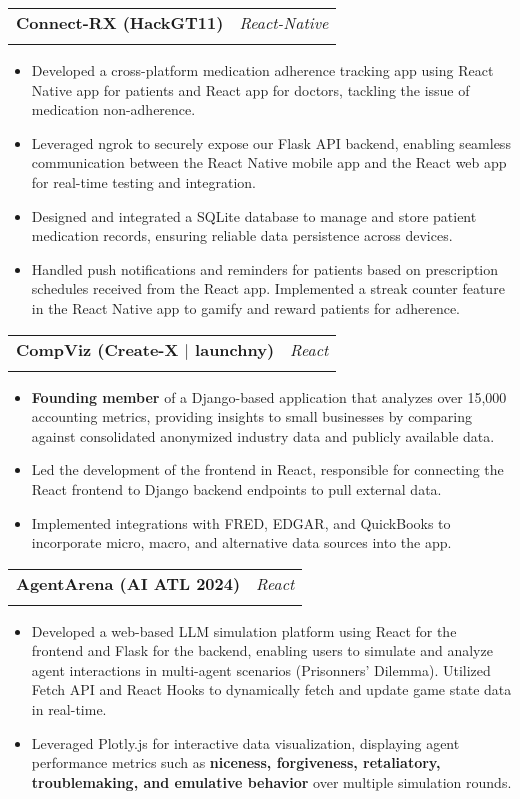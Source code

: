 \documentclass[letterpaper,11pt]{article}
\makeatletter
\newcommand{\resumeItem}[1]{
  \item\small{
    {#1 \vspace{-2pt}}
  }
}
\newcommand{\resumeSubheading}[4]{
  \vspace{-2pt}\item
    \begin{tabular*}{0.97\textwidth}[t]{l@{\extracolsep{\fill}}r}
      \textbf{#1} & #2 \\
      \textit{\small#3} & \textit{\small #4} \\
    \end{tabular*}\vspace{-7pt}
}
\newcommand{\resumeItemListStart}{\begin{itemize}}
\newcommand{\resumeItemListEnd}{\end{itemize}\vspace{-8pt}}
\makeatother
\begin{document}
    \resumeSubheading
    {Connect-RX (HackGT11)}{\textit{React-Native}}
    {}{}
    \resumeItemListStart
    \vspace{-5mm}
      \resumeItem{Developed a cross-platform medication adherence tracking app using React Native app for patients and React app for doctors, tackling the issue of medication non-adherence.}
      \resumeItem{Leveraged ngrok to securely expose our Flask API backend, enabling seamless communication between the React Native mobile app and the React web app for real-time testing and integration.}
      \resumeItem{Designed and integrated a SQLite database to manage and store patient medication records, ensuring reliable data persistence across devices.}
      \resumeItem{Handled push notifications and reminders for patients based on prescription schedules received from the React app. Implemented a streak counter feature in the React Native app to gamify and reward patients for adherence.}
    \resumeItemListEnd

    \resumeSubheading
    {CompViz (Create-X $|$ launchny)}{\textit{React}}
    {}{}
    \resumeItemListStart
    \vspace{-5mm}
      \resumeItem{\textbf{Founding member} of a Django-based application that analyzes over 15,000 accounting metrics, providing insights to small businesses by comparing against consolidated anonymized industry data and publicly available data.}
      \resumeItem{Led the development of the frontend in React, responsible for connecting the React frontend to Django backend endpoints to pull external data.}
      \resumeItem{Implemented integrations with FRED, EDGAR, and QuickBooks to incorporate micro, macro, and alternative data sources into the app.}
    \resumeItemListEnd

    \resumeSubheading
    {AgentArena (AI ATL 2024)}{\textit{React}}
    {}{}
    \resumeItemListStart
    \vspace{-5mm}
      \resumeItem{Developed a web-based LLM simulation platform using React for the frontend and Flask for the backend, enabling users to simulate and analyze agent interactions in multi-agent scenarios (Prisonners' Dilemma). Utilized Fetch API and React Hooks to dynamically fetch and update game state data in real-time.}
      \resumeItem{Leveraged Plotly.js for interactive data visualization, displaying agent performance metrics such as \textbf{niceness, forgiveness, retaliatory, troublemaking, and emulative behavior} over multiple simulation rounds.}
    \resumeItemListEnd
  
\end{document}
